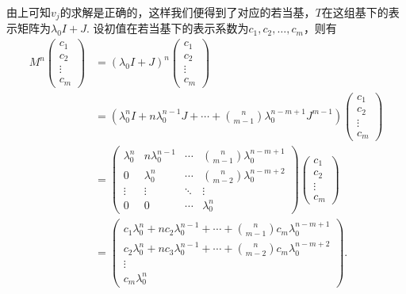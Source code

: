 由上可知$v_j$的求解是正确的，这样我们便得到了对应的若当基，$T$在这组基下的表示矩阵为$\lambda_0 I + J$. 设初值在若当基下的表示系数为$c_1, c_2, \ldots, c_m$，则有
\begin{align*}
    M^n \begin{pmatrix}
            c_1 \\ c_2 \\ \vdots \\ c_m
        \end{pmatrix}
     & = (\lambda_0 I + J)^n
    \begin{pmatrix}
        c_1 \\ c_2 \\ \vdots \\ c_m
    \end{pmatrix}                                                                               \\
     & = (\lambda_0^n I + n \lambda_0^{n - 1} J + \cdots + \binom{n}{m - 1} \lambda_0^{n - m + 1} J^{m - 1})
    \begin{pmatrix}
        c_1 \\ c_2 \\ \vdots \\ c_m
    \end{pmatrix}                                                                               \\
     & = \begin{pmatrix}
             \lambda_0^n & n \lambda_0^{n - 1} & \cdots & \binom{n}{m - 1} \lambda_0^{n - m + 1} \\
             0           & \lambda_0^n         & \cdots & \binom{n}{m - 2} \lambda_0^{n - m + 2} \\
             \vdots      & \vdots              & \ddots & \vdots                                 \\
             0           & 0                   & \cdots & \lambda_0^n
         \end{pmatrix}
    \begin{pmatrix}
        c_1 \\ c_2 \\ \vdots \\ c_m
    \end{pmatrix}                                                                               \\
     & = \begin{pmatrix}
             c_1 \lambda_0^n + n c_2 \lambda_0^{n - 1} + \cdots + \binom{n}{m - 1} c_m \lambda_0^{n - m + 1} \\
             c_2 \lambda_0^n + n c_3 \lambda_0^{n - 1} + \cdots + \binom{n}{m - 2} c_m \lambda_0^{n - m + 2} \\
             \vdots                                                                                          \\
             c_m \lambda_0^n
         \end{pmatrix}.
\end{align*}

